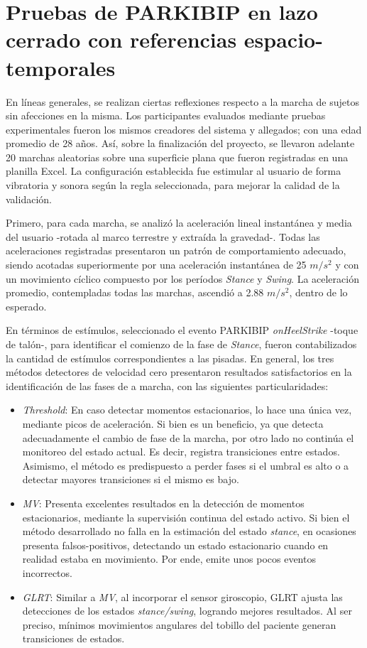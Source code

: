 \section{Pruebas de PARKIBIP en lazo cerrado con referencias espacio-temporales }

En líneas generales, se realizan ciertas reflexiones respecto a la marcha de sujetos sin afecciones en la misma. Los participantes evaluados mediante pruebas experimentales fueron los mismos creadores del sistema y allegados; con una edad promedio de 28 años. Así, sobre la finalización del proyecto, se llevaron adelante 20 marchas aleatorias sobre una superficie plana que fueron registradas en una planilla Excel. La configuración establecida fue estimular al usuario de forma vibratoria y sonora según la regla seleccionada, para mejorar la calidad de la validación.

Primero, para cada marcha, se analizó la aceleración lineal instantánea y media del usuario -rotada al marco terrestre y extraída la gravedad-. Todas las aceleraciones registradas presentaron un patrón de comportamiento adecuado, siendo acotadas superiormente por una aceleración instantánea de 25 $m/s^2$ y con un movimiento cíclico compuesto por los períodos \textit{Stance} y \textit{Swing}. La aceleración promedio, contempladas todas las marchas, ascendió a 2.88 $m/s^2$, dentro de lo esperado.

En términos de estímulos, seleccionado el evento PARKIBIP \textit{onHeelStrike} -toque de talón-, para identificar el comienzo de la fase de \textit{Stance}, fueron contabilizados la cantidad de estímulos correspondientes a las pisadas. En general, los tres métodos detectores de velocidad cero presentaron resultados satisfactorios en la identificación de las fases de a marcha, con las siguientes particularidades:

\begin{itemize}
    \item \textit{Threshold}: En caso detectar momentos estacionarios, lo hace una única vez, mediante picos de aceleración. Si bien es un beneficio, ya que detecta adecuadamente el cambio de fase de la marcha, por otro lado no continúa el monitoreo del estado actual. Es decir, registra transiciones entre estados. Asimismo, el método es predispuesto a perder fases si el umbral es alto o a detectar mayores transiciones si el mismo es bajo.
    \item \textit{MV}: Presenta excelentes resultados en la detección de momentos estacionarios, mediante la supervisión continua del estado activo. Si bien el método desarrollado no falla en la estimación del estado \textit{stance}, en ocasiones presenta falsos-positivos, detectando un estado estacionario cuando en realidad estaba en movimiento. Por ende, emite unos pocos eventos incorrectos.   
    \item \textit{GLRT}: Similar a \textit{MV}, al incorporar el sensor giroscopio, GLRT ajusta las detecciones de los estados \textit{stance/swing}, logrando mejores resultados. Al ser preciso, mínimos movimientos angulares del tobillo del paciente generan transiciones de estados.
\end{itemize}

